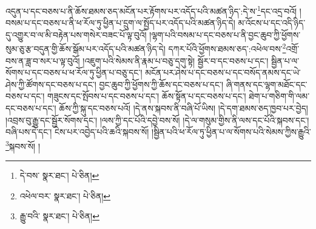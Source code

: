 འདུན་པ་དང་བཅས་པ་ནི་ཆོས་ཐམས་ཅད་མངོན་པར་རྟོགས་པར་འདོད་པའི་མཚན་ཉིད་:དེ་ས་\footnote{དེ་བས་  སྣར་ཐང་།  པེ་ཅིན། }དང་འདྲ་བའོ། །བསམ་པ་དང་བཅས་པ་ནི་ཕ་རོལ་ཏུ་ཕྱིན་པ་དྲུག་ལ་སྤྱོད་པར་འདོད་པའི་མཚན་ཉིད་དེ། མ་འོངས་པ་དང་འདི་ཉིད་དུ་འགྱུར་བ་ལ་མི་བརྟེན་པས་གསེར་བཟང་པོ་ལྟ་བུའོ། །ལྷག་པའི་བསམ་པ་དང་བཅས་པ་ནི་བྱང་ཆུབ་ཀྱི་ཕྱོགས་སུམ་ཅུ་རྩ་བདུན་གྱི་ཆོས་སྒོམ་པར་འདོད་པའི་མཚན་ཉིད་དེ། དཀར་པོའི་ཕྱོགས་ཐམས་ཅད་:འཕེལ་བས་\footnote{འཕེལ་བར་  སྣར་ཐང་།  པེ་ཅིན། }འགྲོ་བས་ན་ཟླ་བ་སར་པ་ལྟ་བུའོ། །འཇུག་པའི་སེམས་ནི་རྣམ་པ་བཅུ་དགུ་སྟེ། སྦྱོར་བ་དང་བཅས་པ་དང་། སྦྱིན་པ་ལ་སོགས་པ་དང་བཅས་པ་ཕ་རོལ་ཏུ་ཕྱིན་པ་བཅུ་དང་། མངོན་པར་ཤེས་པ་དང་བཅས་པ་དང་བསོད་ནམས་དང་ཡེ་ཤེས་ཀྱི་ཚོགས་དང་བཅས་པ་དང་། བྱང་ཆུབ་ཀྱི་ཕྱོགས་ཀྱི་ཆོས་དང་བཅས་པ་དང་། ཞི་གནས་དང་ལྷག་མཐོང་དང་བཅས་པ་དང་། གཟུངས་དང་སྤོབས་པ་དང་བཅས་པ་དང་། ཆོས་སྟོན་པ་དང་བཅས་པ་དང་། ཐེག་པ་གཅིག་གི་ལམ་དང་བཅས་པ་དང་། ཆོས་ཀྱི་སྐུ་དང་བཅས་པའོ། །དེ་ནས་སྐབས་ནི་བཞི་པོ་ཡིས། །དེ་དག་ཐམས་ཅད་ཁྱབ་པར་བྱེད། །འབྲས་བུ་རྒྱུ་དང་སྦྱོར་སོགས་དང་། །ལས་ཀྱི་དང་པོའི་དབྱེ་བས་སོ། །དེ་ལ་གསུམ་གྱིས་ནི་ལས་དང་པོའི་སྐབས་དང་། བཞི་པས་དེ་དང་། ངེས་པར་འབྱེད་པའི་ཆའི་སྐབས་སོ། །སྦྱིན་པའི་ཕ་རོལ་ཏུ་ཕྱིན་པ་ལ་སོགས་པའི་སེམས་ཀྱིས་རྒྱུའི་\footnote{རྒྱུ་བའི་  སྣར་ཐང་།  པེ་ཅིན། }སྐབས་སོ། །
